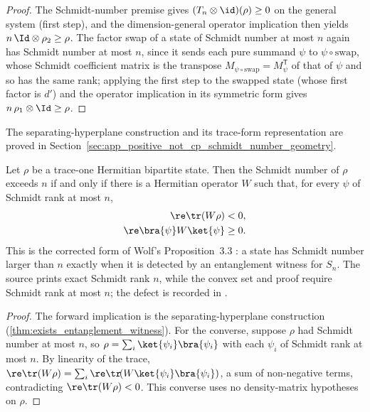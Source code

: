 \begin{proof}
    \leanok
    The Schmidt-number premise gives $(T_n\otimes\id)(\rho)\ge 0$ on the general system
    (first step), and the dimension-general operator implication then yields
    $n\,\Id\otimes\rho_2\ge\rho$. The factor swap of a state of Schmidt number at most
    $n$ again has Schmidt number at most $n$, since it sends each pure summand $\psi$ to
    $\psi\circ\mathrm{swap}$, whose Schmidt coefficient matrix is the transpose
    $M_{\psi\circ\mathrm{swap}}=M_\psi^{\mathsf T}$ of that of $\psi$ and so has the same
    rank; applying the first step to the swapped state (whose first factor is $d'$) and
    the operator implication in its symmetric form gives $n\,\rho_1\otimes\Id\ge\rho$.
\end{proof}


The separating-hyperplane construction and its trace-form representation are
proved in Section~\ref{sec:app_positive_not_cp_schmidt_number_geometry}.

\begin{theorem}
    \label{thm:not_has_schmidt_number_le_iff_exists_witness}
    \leanok
    Let $\rho$ be a trace-one Hermitian bipartite state. Then the Schmidt number of
    $\rho$ exceeds $n$ if and only if there is a Hermitian operator $W$ such that, for
    every $\psi$ of Schmidt rank at most $n$,
    \begin{align}
        \re\tr(W\rho)            & <0,
        \notag                            \\
        \re\bra{\psi}W\ket{\psi} & \ge 0.
        \notag
    \end{align}
    This is the corrected form of Wolf's Proposition~3.3
    \cite[Chapter~3, Proposition~3.3]{Wolf2012Quantum}: a state has Schmidt number
    larger than $n$ exactly when it is detected by an entanglement witness for $S_n$.
    The source prints exact Schmidt rank $n$, while the convex set and proof require
    Schmidt rank at most $n$; the defect is recorded in
    \cite{gap:wolf_prop3_1_exact_schmidt_rank_scope}.
\end{theorem}

\begin{proof}
    \leanok
    The forward implication is the separating-hyperplane construction
    (\ref{thm:exists_entanglement_witness}). For the converse, suppose $\rho$ had Schmidt
    number at most $n$, so $\rho=\sum_i\ket{\psi_i}\bra{\psi_i}$ with each $\psi_i$ of
    Schmidt rank at most $n$. By linearity of the trace,
    $\re\tr(W\rho)=\sum_i\re\tr\!(W\ket{\psi_i}\bra{\psi_i})$,
    a sum of non-negative terms, contradicting $\re\tr(W\rho)<0$. This
    converse uses no density-matrix hypotheses on $\rho$.
\end{proof}

